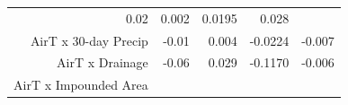 \documentclass[]{article}
\begin{document}
\begin{longtable}[c]{@{}rrrrr@{}}
\begin{minipage}[t]{0.08\columnwidth}\raggedleft\strut
0.02
\strut\end{minipage} &
\begin{minipage}[t]{0.07\columnwidth}\raggedleft\strut
0.002
\strut\end{minipage} &
\begin{minipage}[t]{0.10\columnwidth}\raggedleft\strut
0.0195
\strut\end{minipage} &
\begin{minipage}[t]{0.10\columnwidth}\raggedleft\strut
0.028
\strut\end{minipage}\tabularnewline
\begin{minipage}[t]{0.37\columnwidth}\raggedleft\strut
AirT x 30-day Precip
\strut\end{minipage} &
\begin{minipage}[t]{0.08\columnwidth}\raggedleft\strut
-0.01
\strut\end{minipage} &
\begin{minipage}[t]{0.07\columnwidth}\raggedleft\strut
0.004
\strut\end{minipage} &
\begin{minipage}[t]{0.10\columnwidth}\raggedleft\strut
-0.0224
\strut\end{minipage} &
\begin{minipage}[t]{0.10\columnwidth}\raggedleft\strut
-0.007
\strut\end{minipage}\tabularnewline
\begin{minipage}[t]{0.37\columnwidth}\raggedleft\strut
AirT x Drainage
\strut\end{minipage} &
\begin{minipage}[t]{0.08\columnwidth}\raggedleft\strut
-0.06
\strut\end{minipage} &
\begin{minipage}[t]{0.07\columnwidth}\raggedleft\strut
0.029
\strut\end{minipage} &
\begin{minipage}[t]{0.10\columnwidth}\raggedleft\strut
-0.1170
\strut\end{minipage} &
\begin{minipage}[t]{0.10\columnwidth}\raggedleft\strut
-0.006
\strut\end{minipage}\tabularnewline
\begin{minipage}[t]{0.37\columnwidth}\raggedleft\strut
AirT x Impounded Area
\strut\end{minipage} &
\begin{minipage}[t]{0.08\columnwidth}\raggedleft\strut

\end{minipage}
\end{longtable}
\end{document}
